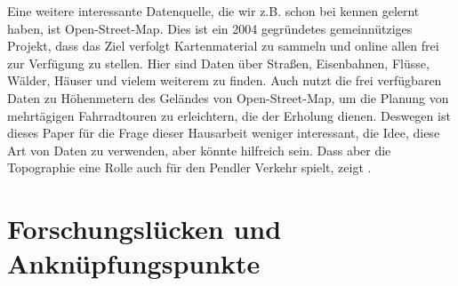 \documentclass[a4paper,12pt]{thesis}
\begin{document}
Eine weitere interessante Datenquelle, die wir z.B. schon bei \cite{Alattar2021} kennen gelernt haben, ist Open-Street-Map. Dies ist ein 2004 gegründetes gemeinnütziges Projekt, dass das Ziel verfolgt Kartenmaterial zu sammeln und online allen frei zur Verfügung zu stellen. Hier sind Daten über Straßen, Eisenbahnen, Flüsse, Wälder, Häuser und vielem weiterem zu finden. Auch \cite{Carl2015} nutzt die frei verfügbaren Daten zu Höhenmetern des Geländes von Open-Street-Map, um die Planung von mehrtägigen Fahrradtouren zu erleichtern, die der Erholung dienen. Deswegen ist dieses Paper für die Frage dieser Hausarbeit weniger interessant, die Idee, diese Art von Daten zu verwenden, aber könnte hilfreich sein. Dass aber die Topographie eine Rolle auch für den Pendler Verkehr spielt, zeigt \cite{Rietveld2004}.

\section{Forschungslücken und Anknüpfungspunkte}
\end{document}
